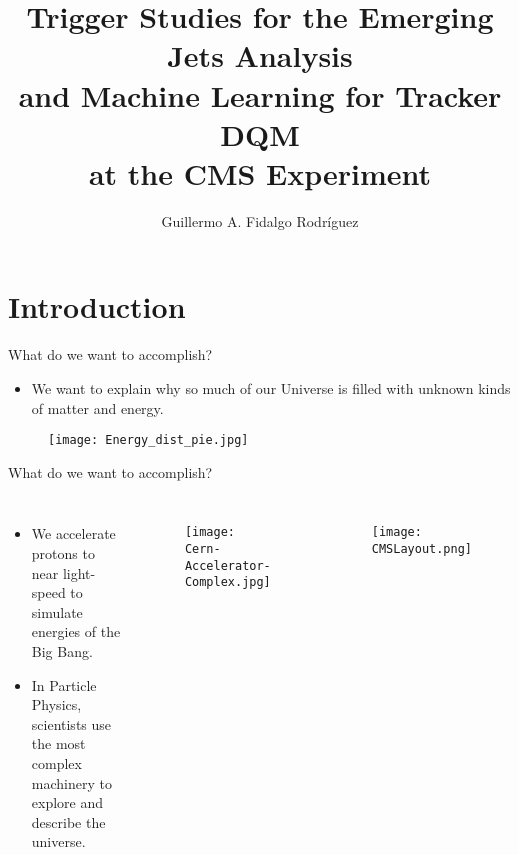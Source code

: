 \documentclass[8pt,aspectratio=169]{beamer}
\title[EMJ and ML4TkDQM]{Trigger Studies for the Emerging Jets Analysis \\and Machine Learning for Tracker DQM \\at the CMS Experiment}
\author[GAFR]{Guillermo A. Fidalgo Rodríguez}
\institute[UPRM]{University of Puerto Rico - Mayagüez}
\begin{document}
\maketitle

\begin{frame}
    \Large
	\tableofcontents
\end{frame}

\section{Introduction}
\begin{frame}{What do we want to accomplish?}    
    \begin{itemize}
        \item We want to explain why so much of our Universe is filled with unknown kinds of matter and energy.
    \end{itemize}
    \begin{figure}
        \centering
        \texttt{[image: Energy\_dist\_pie.jpg]}
    \end{figure}
\end{frame}
\begin{frame}{What do we want to accomplish?}  
    \begin{columns}
        \begin{itemize}
            \item We accelerate protons to near light-speed to simulate energies of the Big Bang.
            \item In Particle Physics, scientists use the most complex machinery to explore and describe the universe. 
        \end{itemize}
        \begin{figure}
            \centering
            \texttt{[image: Cern-Accelerator-Complex.jpg]}
        \end{figure}
        \begin{figure}
                \centering
                \texttt{[image: CMSLayout.png]}
        \end{figure}
    \end{columns}  
\end{frame}
\end{document}
